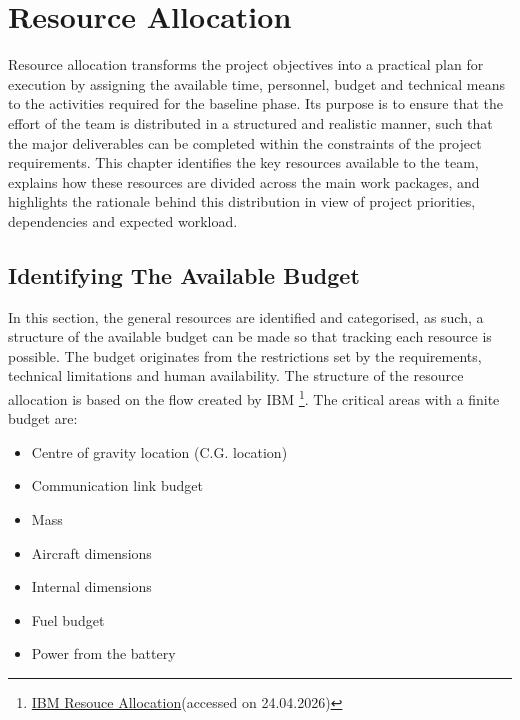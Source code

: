 \chapter{Resource Allocation}

Resource allocation transforms the project objectives into a practical plan for execution by assigning the available time, personnel, budget and technical means to the activities required for the baseline phase. Its purpose is to ensure that the effort of the team is distributed in a structured and realistic manner, such that the major deliverables can be completed within the constraints of the project requirements. This chapter identifies the key resources available to the team, explains how these resources are divided across the main work packages, and highlights the rationale behind this distribution in view of project priorities, dependencies and expected workload.

\section{Identifying The Available Budget}
In this section, the general resources are identified and categorised, as such, a structure of the available budget can be made so that tracking each resource is possible. The budget originates from the restrictions set by the requirements, technical limitations and human availability. The structure of the resource allocation is based on the flow created by IBM \footnote{\href{https://www.ibm.com/think/topics/resource-allocation}{IBM Resouce Allocation}(accessed on 24.04.2026)}.
The critical areas with a finite budget are:

\begin{itemize}
    \item Centre of gravity location (C.G. location)
    \item Communication link budget
    \item Mass
    \item Aircraft dimensions
    \item Internal dimensions
    \item Fuel budget
    \item Power from the battery
\end{itemize}



